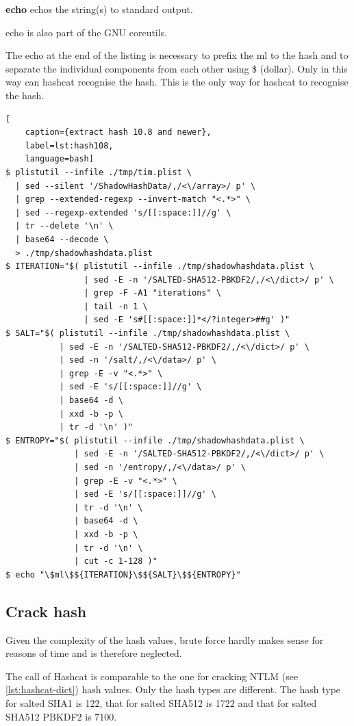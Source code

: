 \textbf{echo} echos the string(s) to standard output.

echo is also part of the GNU coreutils.

The echo at the end of the listing is necessary to prefix the \glqq{}ml\grqq{} to the hash and to separate the individual components from each other using \$ (dollar). Only in this way can hashcat recognise the hash. This is the only way for hashcat to recognise the hash.

\begin{lstlisting}[
    caption={extract hash 10.8 and newer},
    label=lst:hash108,
    language=bash]
$ plistutil --infile ./tmp/tim.plist \
  | sed --silent '/ShadowHashData/,/<\/array>/ p' \
  | grep --extended-regexp --invert-match "<.*>" \
  | sed --regexp-extended 's/[[:space:]]//g' \
  | tr --delete '\n' \
  | base64 --decode \
  > ./tmp/shadowhashdata.plist
$ ITERATION="$( plistutil --infile ./tmp/shadowhashdata.plist \
                | sed -E -n '/SALTED-SHA512-PBKDF2/,/<\/dict>/ p' \
                | grep -F -A1 "iterations" \
                | tail -n 1 \
                | sed -E 's#[[:space:]]*</?integer>##g' )"
$ SALT="$( plistutil --infile ./tmp/shadowhashdata.plist \
           | sed -E -n '/SALTED-SHA512-PBKDF2/,/<\/dict>/ p' \
           | sed -n '/salt/,/<\/data>/ p' \
           | grep -E -v "<.*>" \
           | sed -E 's/[[:space:]]//g' \
           | base64 -d \
           | xxd -b -p \
           | tr -d '\n' )"
$ ENTROPY="$( plistutil --infile ./tmp/shadowhashdata.plist \
              | sed -E -n '/SALTED-SHA512-PBKDF2/,/<\/dict>/ p' \
              | sed -n '/entropy/,/<\/data>/ p' \
              | grep -E -v "<.*>" \
              | sed -E 's/[[:space:]]//g' \
              | tr -d '\n' \
              | base64 -d \
              | xxd -b -p \
              | tr -d '\n' \
              | cut -c 1-128 )"
$ echo "\$ml\$${ITERATION}\$${SALT}\$${ENTROPY}"
\end{lstlisting}

\subsection{Crack hash}

Given the complexity of the hash values, brute force hardly makes sense for reasons of time and is therefore neglected.

The call of Hashcat is comparable to the one for cracking NTLM (see \cref{lst:hashcat-dict}) hash values. Only the hash types are different. The hash type for salted SHA1 is 122, that for salted SHA512 is 1722 and that for salted SHA512 PBKDF2 is 7100.

